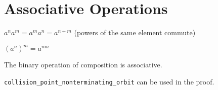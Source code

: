 
\chapter{Associative Operations}


\begin{lemma}
	$a^na^m = a^ma^n = a^{n+m}$ (powers of the same element commute)
\end{lemma}

\begin{lemma}
	$(a^n)^m = a^{nm}$
\end{lemma}

\begin{lemma}
	The binary operation of composition is associative.
\end{lemma}

\begin{lemma}
	\verb|collision_point_nonterminating_orbit| can be used in the proof.
\end{lemma}

